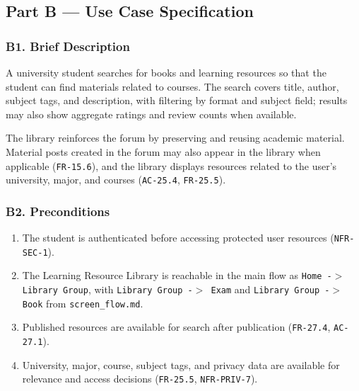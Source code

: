 \documentclass[12pt]{article}
\begin{document}
\subsection*{Part B --- Use Case Specification}
\par\medskip

\hypertarget{sec:b1-brief-description}{}
\subsubsection*{B1. Brief Description}
\par\medskip

A university student searches for books and learning resources so that the student can find materials related to courses. The search covers title, author, subject tags, and description, with filtering by format and subject field; results may also show aggregate ratings and review counts when available.
\par\medskip

The library reinforces the forum by preserving and reusing academic material. Material posts created in the forum may also appear in the library when applicable (\texttt{FR-15.6}), and the library displays resources related to the user's university, major, and courses (\texttt{AC-25.4}, \texttt{FR-25.5}).
\par\medskip

\hypertarget{sec:b2-preconditions}{}
\subsubsection*{B2. Preconditions}
\par\medskip

\begin{enumerate}
\item The student is authenticated before accessing protected user resources (\texttt{NFR-SEC-1}).
\item The Learning Resource Library is reachable in the main flow as \texttt{Home -$>$ Library Group}, with \texttt{Library Group -$>$ Exam} and \texttt{Library Group -$>$ Book} from \texttt{screen\_flow.md}.
\item Published resources are available for search after publication (\texttt{FR-27.4}, \texttt{AC-27.1}).
\item University, major, course, subject tags, and privacy data are available for relevance and access decisions (\texttt{FR-25.5}, \texttt{NFR-PRIV-7}).
\end{enumerate}
\par\medskip
\end{document}
